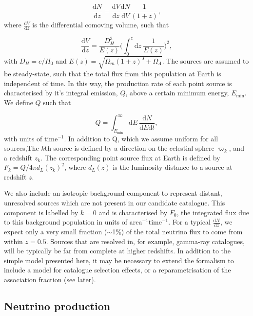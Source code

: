 \documentclass[fontsize=12pt]{article}
\begin{document}
\begin{equation}
\frac{\mathrm{d}N}{\mathrm{d}z} = \frac{\mathrm{d}V}{\mathrm{d}z}\frac{\mathrm{d}N}{\mathrm{d}V}\frac{1}{(1+z)},
\end{equation}
where $\frac{\mathrm{d}V}{\mathrm{d}z}$ is the differential comoving volume, such that

\begin{equation}
\frac{\mathrm{d}V}{\mathrm{d}z} = 
\frac{D_H^3}{E(z)} \Bigg( \int_0^z \mathrm{d}z \  \frac{1}{E(z)} \Bigg)^2, 
\end{equation}
with $D_H = c / H_0$ and $E(z) = \sqrt{\Omega_m(1 + z)^3 + \Omega_\Lambda}$. The sources are assumed to be steady-state, such that the total flux from this population at Earth is independent of time. In this way, the production rate of each point source is characterised by it's integral emission, $Q$, above a certain minimum energy, $E_\mathrm{min}$. We define $Q$ such that

\begin{equation}
Q = \int_{E_\mathrm{min}}^{\infty} \mathrm{d}E \ \frac{\mathrm{d}N}{\mathrm{d}E \mathrm{d}t},
\end{equation}
with units of $\mathrm{time}^{-1}$. In addition to Q, which we assume uniform for all sources,The $k$th source is defined by a direction on the celestial sphere $\varpi_k$, and a redshift $z_k$. The corresponding point source flux at Earth is defined by $F_k = Q/4 \pi d_L(z_k)^2$, where $d_L(z)$ is the luminosity distance to a source at redshift $z$.

We also include an isotropic background component to represent distant, unresolved sources which are not present in our candidate catalogue. This component is labelled by $k=0$ and is characterised by $F_0$, the integrated flux due to this background population in units of $\mathrm{area}^{-1}\mathrm{time}^{-1}$. For a typical $\frac{\mathrm{d}N}{\mathrm{d}{z}}$, we expect only a very small fraction ($\sim$1\%) of the total neutrino flux to come from within $z = 0.5$. Sources that are resolved in, for example, gamma-ray catalogues, will be typically be far from complete at higher redshifts. In addition to the simple model presented here, it may be necessary to extend the formalism to include a model for catalogue selection effects, or a reparametrisation of the association fraction (see later).

\subsection{Neutrino production}
\end{document}
